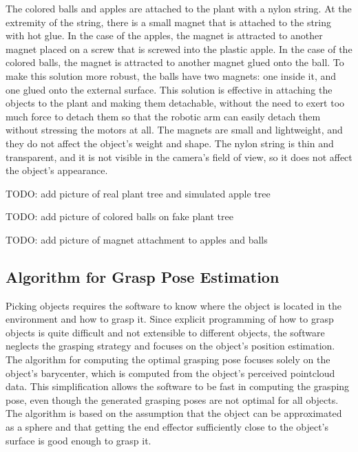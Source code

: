 The colored balls and apples are attached to the plant with a nylon string. At the extremity of the string, there is a small
magnet that is attached to the string with hot glue. In the case of the apples, the magnet is attracted to another magnet
placed on a screw that is screwed into the plastic apple. In the case of the colored balls, the magnet is attracted
to another magnet glued onto the ball. To make this solution more robust, the balls have two magnets: one inside it,
and one glued onto the external surface.
This solution is effective in attaching the objects to the plant and making them detachable, 
without the need to exert too much force to detach them so that the robotic arm can easily detach them
without stressing the motors at all. The magnets are small and lightweight, and they do not affect the object's weight and shape.
The nylon string is thin and transparent, and it is not visible in the camera's field of view, 
so it does not affect the object's appearance.

TODO: add picture of real plant tree and simulated apple tree

TODO: add picture of colored balls on fake plant tree

TODO: add picture of magnet attachment to apples and balls

\subsection{Algorithm for Grasp Pose Estimation}

Picking objects requires the software to know where the object is located in the environment and how to grasp it.
Since explicit programming of how to grasp objects is quite difficult and not extensible to different objects,
the software neglects the grasping strategy and focuses on the object's position estimation. The algorithm for
computing the optimal grasping pose focuses solely on the object's barycenter, which is computed from the object's
perceived pointcloud data. This simplification allows the software to be fast in computing the grasping pose,
even though the generated grasping poses are not optimal for all objects. The algorithm is based on the assumption
that the object can be approximated as a sphere and that getting the end effector sufficiently close to the
object's surface is good enough to grasp it.

